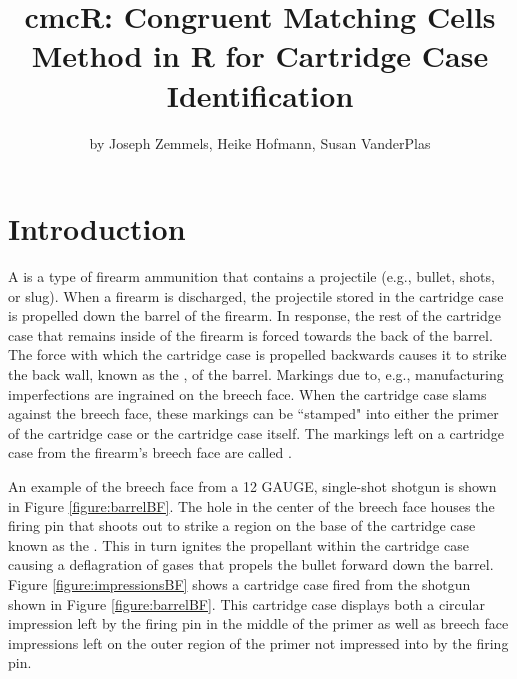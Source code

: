 \title{cmcR: Congruent Matching Cells Method in R for Cartridge Case
Identification}
\author{by Joseph Zemmels, Heike Hofmann, Susan VanderPlas}

\maketitle


\hypertarget{intro}{%
\section{Introduction}\label{intro}}

A  is a type of firearm ammunition that contains a
projectile (e.g., bullet, shots, or slug). When a firearm is discharged,
the projectile stored in the cartridge case is propelled down the barrel
of the firearm. In response, the rest of the cartridge case that remains
inside of the firearm is forced towards the back of the barrel. The
force with which the cartridge case is propelled backwards causes it to
strike the back wall, known as the , of the barrel.
Markings due to, e.g., manufacturing imperfections are ingrained on the
breech face. When the cartridge case slams against the breech face,
these markings can be ``stamped" into either the primer of the cartridge
case or the cartridge case itself. The markings left on a cartridge case
from the firearm's breech face are called .

An example of the breech face from a 12 GAUGE, single-shot shotgun is
shown in Figure \ref{figure:barrelBF}. The hole in the center of the
breech face houses the firing pin that shoots out to strike a region on
the base of the cartridge case known as the . This in turn
ignites the propellant within the cartridge case causing a deflagration
of gases that propels the bullet forward down the barrel. Figure
\ref{figure:impressionsBF} shows a cartridge case fired from the shotgun
shown in Figure \ref{figure:barrelBF}. This cartridge case displays both
a circular impression left by the firing pin in the middle of the primer
as well as breech face impressions left on the outer region of the
primer not impressed into by the firing pin.

